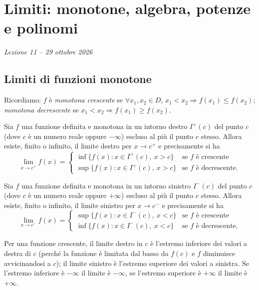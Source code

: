 \documentclass[11pt,a4paper]{article}
\begin{document}
\section[Limiti: monotone, algebra, potenze e polinomi (Lezione 11 -- 29 ottobre 2026)]{Limiti: monotone, algebra, potenze e polinomi}
\noindent\emph{Lezione 11 -- 29 ottobre 2026}
\subsection{Limiti di funzioni monotone}

Ricordiamo: $f$ è \emph{monotona crescente} se $\forall x_1, x_2 \in D$, $x_1 < x_2 \Rightarrow f(x_1) \le f(x_2)$; \emph{monotona decrescente} se $x_1 < x_2 \Rightarrow f(x_1) \ge f(x_2)$.

\begin{proposizione}
Sia $f$ una funzione definita e monotona in un intorno destro $I^+(c)$ del punto $c$ (dove $c$ è un numero reale oppure $-\infty$) escluso al più il punto $c$ stesso. Allora esiste, finito o infinito, il limite destro per $x \to c^+$ e precisamente si ha
\[
\lim_{x\to c^+} f(x) = \begin{cases} \inf\{f(x) : x \in I^+(c),\ x > c\} & \text{se } f \text{ è crescente} \\ \sup\{f(x) : x \in I^+(c),\ x > c\} & \text{se } f \text{ è decrescente.} \end{cases}
\]
\end{proposizione}

\begin{proposizione}
Sia $f$ una funzione definita e monotona in un intorno sinistro $I^-(c)$ del punto $c$ (dove $c$ è un numero reale oppure $+\infty$) escluso al più il punto $c$ stesso. Allora esiste, finito o infinito, il limite sinistro per $x \to c^-$ e precisamente si ha
\[
\lim_{x\to c^-} f(x) = \begin{cases} \sup\{f(x) : x \in I^-(c),\ x < c\} & \text{se } f \text{ è crescente} \\ \inf\{f(x) : x \in I^-(c),\ x < c\} & \text{se } f \text{ è decrescente.} \end{cases}
\]
\end{proposizione}

Per una funzione crescente, il limite destro in $c$ è l'estremo inferiore dei valori a destra di $c$ (perché la funzione è limitata dal basso da $f(c)$ e $f$ diminuisce avvicinandosi a $c$); il limite sinistro è l'estremo superiore dei valori a sinistra. Se l'estremo inferiore è $-\infty$ il limite è $-\infty$, se l'estremo superiore è $+\infty$ il limite è $+\infty$.
\end{document}
